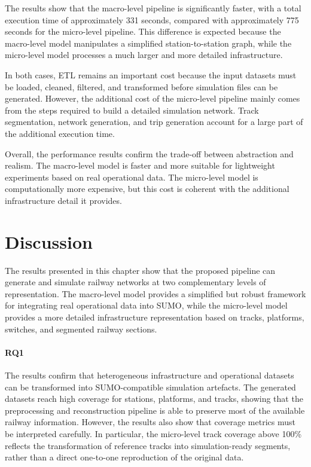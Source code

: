 
The results show that the macro-level pipeline is significantly faster, with a total execution time of approximately 331 
seconds, compared with approximately 775 seconds for the micro-level pipeline. This difference is expected because the 
macro-level model manipulates a simplified station-to-station graph, while the micro-level model processes a much larger 
and more detailed infrastructure.

In both cases, ETL remains an important cost because the input datasets must be loaded, cleaned, filtered, and transformed 
before simulation files can be generated. However, the additional cost of the micro-level pipeline mainly comes from the 
steps required to build a detailed simulation network. Track segmentation, network generation, and trip generation account 
for a large part of the additional execution time.

Overall, the performance results confirm the trade-off between abstraction and realism. The macro-level model is faster and 
more suitable for lightweight experiments based on real operational data. The micro-level model is computationally more 
expensive, but this cost is coherent with the additional infrastructure detail it provides.


\section{Discussion}
The results presented in this chapter show that the proposed pipeline can generate and simulate railway networks at two 
complementary levels of representation. The macro-level model provides a simplified but robust framework for integrating 
real operational data into SUMO, while the micro-level model provides a more detailed infrastructure representation based 
on tracks, platforms, switches, and segmented railway sections.

\paragraph{\textbf{RQ1}} The results confirm that heterogeneous infrastructure and operational datasets can be transformed 
into SUMO-compatible simulation artefacts. The generated datasets reach high coverage for stations, platforms, and tracks, 
showing that the preprocessing and reconstruction pipeline is able to preserve most of the available railway information. 
However, the results also show that coverage metrics must be interpreted carefully. In particular, the micro-level track 
coverage above 100\% reflects the transformation of reference tracks into simulation-ready segments, rather than a direct 
one-to-one reproduction of the original data.

